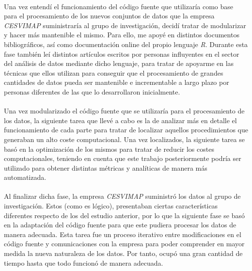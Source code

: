 \documentclass[11pt,a4paper,spanish]{article}
\begin{document}
    \paragraph{}
    Una vez entendí el funcionamiento del código fuente que utilizaría como base para el procesamiento de los nuevos conjuntos de datos que la empresa \emph{CESVIMAP} suministraría al grupo de investigación, decidí tratar de modularizar y hacer más mantenible el mismo. Para ello, me apoyé en distintos documentos bibliográficos, así como documentación online del propio lenguaje \emph{R}. Durante esta fase también leí distintos artículos escritos por personas influyentes en el sector del análisis de datos mediante dicho lenguaje, para tratar de apoyarme en las técnicas que ellos utilizan para conseguir que el procesamiento de grandes cantidades de datos pueda ser mantenible e incrementable a largo plazo por personas diferentes de las que lo desarrollaron inicialmente.

    \paragraph{}
    Una vez modularizado el código fuente que se utilizaría para el procesamiento de los datos, la siguiente tarea que llevé a cabo es la de analizar más en detalle el funcionamiento de cada parte para tratar de localizar aquellos procedimientos que generaban un alto coste computacional. Una vez localizados, la siguiente tarea se basó en la optimización de los mismos para tratar de reducir los costes computacionales, teniendo en cuenta que este trabajo posteriormente podría ser utilizado para obtener distintas métricas y analíticas de manera más automatizada.

    \paragraph{}
    Al finalizar dicha fase, la empresa \emph{CESVIMAP} suministró los datos al grupo de investigación. Estos (como es lógico), presentaban ciertas características diferentes respecto de los del estudio anterior, por lo que la siguiente fase se basó en la adaptación del código fuente para que este pudiera procesar los datos de manera adecuada. Esta tarea fue un proceso iterativo entre modificaciones en el código fuente y comunicaciones con la empresa para poder comprender en mayor medida la nueva naturaleza de los datos. Por tanto, ocupó una gran cantidad de tiempo hasta que todo funcionó de manera adecuada.
\end{document}

